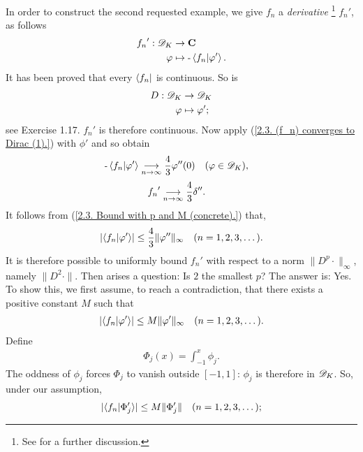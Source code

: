 In order to construct the second requested example, we give %
%
  ${f_n}$ %
%
a \textit{derivative} 
%
  \footnote{
    See  
    for a further discussion.
  } %
${f_n}'$, as follows %
%
  \begin{align}
    {f_n}': {\mathscr D}_K &\to {\mathbf C}\\
                    \varphi &\mapsto \text{\small{-}} \bra{f_n}\ket{\varphi'}. \nonumber
  \end{align}
%
It has been proved that every $\bra{f_n}$ is continuous. %
So is %
%
  \begin{align}
    D : {\mathscr D}_K & \to {\mathscr D}_K \\
        \varphi & \mapsto \varphi'; \nonumber
  \end{align}
see  Exercise 1.17. %
${f_n}'$ is therefore continuous. Now apply %
%
  (\ref{2.3. (f_n) converges to Dirac (1).}) %
%
with $\phi'$ and so obtain %
%
  \begin{align}
    \text{\small{-}} \bra{f_n}\ket{\varphi'} &\underset{n\to\infty}{\longrightarrow} \frac{4}{3} \varphi''(0)
    \quad(\varphi \in {\mathscr D}_K), \nonumber
  \end{align}
%
\ie %
%
  \begin{align}
    {f_n}' &\underset{n\to\infty}{\longrightarrow} \frac{4}{3} \delta''. 
  \end{align}
%
It follows from %
%
  (\ref{2.3. Bound with p and M (concrete).}) %
%
that, 
%
  \begin{align}
  \lvert \bra{f_n}\ket{\varphi'} \rvert 
    \leq 
  \frac{4}{3} \| \varphi''\|_\infty \quad (n=1, 2, 3, \dots).
  \end{align}
%
It is therefore possible to uniformly bound 
%
  ${f_n}'$ %
%
with respect to a norm %
%
  $\|D^p\cdot\|_\infty$, %
%
namely $\|D^2\cdot\|$. 
%
Then arises a question: %
%
  Is $2$ the smallest $p$? 
%
The answer is: Yes. 
%
To show this, we first assume, to reach a contradiction, that %
%
  there exists a positive constant $M$ such that
%
  \begin{align}
    \lvert \langle f_n \lvert \varphi' \rangle \rvert 
      \leq 
    M \| \varphi' \|_\infty 
    \quad (n=1, 2, 3, \dots).
  \end{align}
%
Define %
%
  \begin{align}
    \Phi_{j}(x) = \int_{\minus 1}^x \phi_j.
  \end{align}
%
The oddness of $\phi_j$ forces %
% 
  $\Phi_{j}$ to vanish outside $[\minus 1, 1]$: %
%
$\phi_{j}$ is therefore in ${\mathscr D}_K$. So, under our assumption, 
%
  \begin{align}
    \lvert 
      \langle{f_n}\lvert \Phi_j' \rangle
    \rvert 
      \leq 
    M \| \Phi_{j}' \|
    \quad (n=1, 2, 3, \dots); 
  \end{align}
